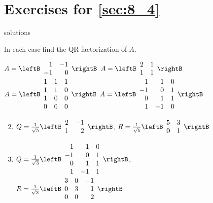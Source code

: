 
\section*{Exercises for \ref{sec:8_4}}

\begin{Filesave}{solutions}
\end{Filesave}

\begin{multicols}{2}
\begin{ex}
In each case find the QR-factorization of $A$.


\begin{exenumerate}[column-sep=-15pt]
\exitem $A = \leftB \begin{array}{rr}
1 & -1 \\
-1 & 0
\end{array}\rightB$
\exitem $A = \leftB \begin{array}{rr}
2 & 1 \\
1 &1
\end{array}\rightB$
\exitem $A = \leftB \begin{array}{rrr}
1 & 1 & 1 \\
1 & 1 & 0 \\
1 & 0 & 0 \\
0 & 0 & 0 
\end{array}\rightB$
\exitem $A = \leftB \begin{array}{rrr}
1 & 1 & 0 \\
-1 & 0 & 1 \\
0 & 1 & 1 \\
1 & -1 & 0 
\end{array}\rightB$
\end{exenumerate}
\begin{sol}
\begin{enumerate}[label={\alph*.}]
\setcounter{enumi}{1}
\item  $Q = \frac{1}{\sqrt{5}}\leftB \begin{array}{rr}
2 & -1 \\
1 & 2 
\end{array}\rightB$,
 $R = \frac{1}{\sqrt{5}}\leftB \begin{array}{rr}
5 & 3 \\
0 & 1 
\end{array}\rightB$

\setcounter{enumi}{3}
\item  $Q = \frac{1}{\sqrt{3}}\leftB \begin{array}{rrr}
1 & 1 & 0 \\
-1 & 0 & 1 \\
0 & 1 & 1 \\
1 & -1 & 1
\end{array}\rightB$, \\
$R = \frac{1}{\sqrt{3}}\leftB \begin{array}{rrr}
3 & 0 & -1 \\
0 & 3 & 1 \\
0 & 0 & 2 
\end{array}\rightB$


\end{enumerate}
\end{sol}
\end{ex}
\end{multicols}
